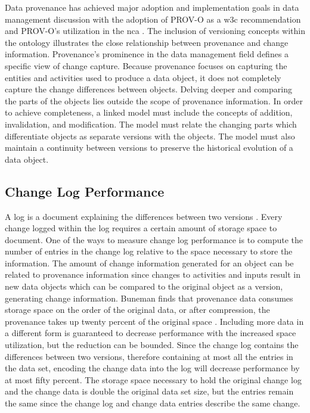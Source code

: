 Data provenance has achieved major adoption and implementation goals in data management discussion with the adoption of PROV-O \cite{Lebo2013} as a \gls{w3c} recommendation and PROV-O's utilization in the \gls{nca} \cite{Ma2014191}.
The inclusion of versioning concepts within the ontology illustrates the close relationship between provenance and change information.
Provenance's prominence in the data management field defines a specific view of change capture.
Because provenance focuses on capturing the entities and activities used to produce a data object, it does not completely capture the change differences between objects.
Delving deeper and comparing the parts of the objects lies outside the scope of provenance information.
In order to achieve completeness, a \gls{linked} model must include the concepts of addition, invalidation, and modification.
The model must relate the changing parts which differentiate objects as separate versions with the objects.
The model must also maintain a continuity between versions to preserve the historical evolution of a data object.

\subsection{Change Log Performance}

A \gls{log} is a document explaining the differences between two versions \cite{uel1037}.
Every change logged within the \gls{log} requires a certain amount of storage space to document.
One of the ways to measure change log performance is to compute the number of entries in the change log relative to the space necessary to store the information.
The amount of change information generated for an object can be related to provenance information since changes to activities and inputs result in new data objects which can be compared to the original object as a version, generating change information.
Buneman finds that provenance data consumes storage space on the order of the original data, or after compression, the provenance takes up twenty percent of the original space \cite{Buneman}.
Including more data in a different form is guaranteed to decrease performance with the increased space utilization, but the reduction can be bounded.
Since the change log contains the differences between two versions, therefore containing at most all the entries in the data set, encoding the change data into the log will decrease performance by at most fifty percent.
The storage space necessary to hold the original change log and the change data is double the original data set size, but the entries remain the same since the change log and change data entries describe the same change.

